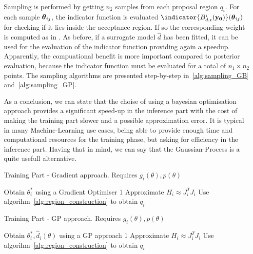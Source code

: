 \noindent
Sampling is performed by getting $n_2$ samples from each proposal
region $q_i$. For each sample $\boldsymbol{\theta}_{ij}$, the indicator function
is evaluated $\indicator{\regioni(\data)}(\thetab_{ij})$ for checking
if it lies inside the acceptance region. If so the corresponding
weight is computed as in \cite{eq:sampling}. As before, if a surrogate
model $\hat{d}$ has been fitted, it can be used for the evaluation of
the indicator function providing again a speedup. Apparently, the
compuational benefit is more important compared to posterior
evaluation, because the indicator function must be evaluated for a
total of $n_1 \times n_2$ points. The sampling algorithms are
presented step-by-step in~\ref{alg:sampling_GB}
and~\ref{alg:sampling_GP}.

\noindent
As a conclusion, we can state that the choise of using a bayesian
optimisation approach provides a significant speed-up in the inference
part with the cost of making the training part slower and a possible
approximation error. It is typical in many Machine-Learning use cases,
being able to provide enough time and computational resources for the
training phase, but asking for efficiency in the inference
part. Having that in mind, we can say that the Gaussian-Process is a
quite usefull alternative.

\begin{minipage}{0.46\textwidth}
\begin{algorithm}[H]
    \centering
    \caption{Training Part - Gradient approach. Requires $g_i(\theta), p(\theta)$}\label{alg:training_GB}
    \begin{algorithmic}[1]
        \State Obtain $\theta_i^*$ using a Gradient Optimiser
         1
        \Else
        \State Approximate $H_i \approx J^T_iJ_i$
        \State Use algorihm~\ref{alg:region_construction} to obtain $q_i$
        \EndIf      
      \EndFor
    \end{algorithmic}
\end{algorithm}
\end{minipage}
\hfill
\begin{minipage}{0.46\textwidth}
\begin{algorithm}[H]
    \centering
    \caption{Training Part - GP approach. Requires $g_i(\theta), p(\theta)$}\label{alg:training_GP}
    \begin{algorithmic}[1]
        \State Obtain $\theta_i^*, \hat{d}_i(\theta)$ using a GP approach
         1
        \Else
        \State Approximate $H_i \approx J^T_iJ_i$
        \State Use algorihm~\ref{alg:region_construction} to obtain $q_i$
        \EndIf      
      \EndFor
    \end{algorithmic}
\end{algorithm}
\end{minipage}

